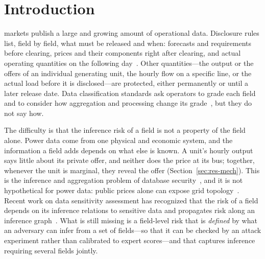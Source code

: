 \section{Introduction}\label{sec:intro}

 markets publish a large and growing amount of operational data. Disclosure rules list, field by
field, what must be released and when: forecasts and requirements before clearing, prices and their components right after
clearing, and actual operating quantities on the following day~\cite{nea2024disclosure}. Other quantities---the output or
the offers of an individual generating unit, the hourly flow on a specific line, or the actual load before it is
disclosed---are protected, either permanently or until a later release date. Data classification standards ask operators
to grade each field and to consider how aggregation and processing change its grade~\cite{gbt43697}, but they do not say how.

The difficulty is that the inference risk of a field is not a property of the field alone. Power data come from one physical
and economic system, and the information a field adds depends on what else is known. A unit's hourly output says little about
its private offer, and neither does the price at its bus; together, whenever the unit is marginal, they reveal the offer
(Section~\ref{sec:res-mech}). This is the inference and aggregation problem of database
security~\cite{lunt1989aggregation,farkas2002inference}, and it is not hypothetical for power data: public prices alone can
expose grid topology~\cite{kekatos2014topology}. Recent work on data sensitivity assessment has recognized that the risk of a
field depends on its inference relations to sensitive data and propagates risk along an inference graph~\cite{hu2026ignn}.
What is still missing is a field-level risk that is \emph{defined} by what an adversary can infer from a set of fields---so
that it can be checked by an attack experiment rather than calibrated to expert scores---and that captures inference
requiring several fields jointly.

